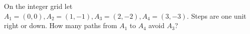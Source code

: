 On the integer grid let $A_1=(0,0), A_2=(1,-1), A_3=(2,-2), A_4=(3,-3)$. Steps are one unit right or down. How many paths from $A_1$ to $A_4$ avoid $A_3$?
